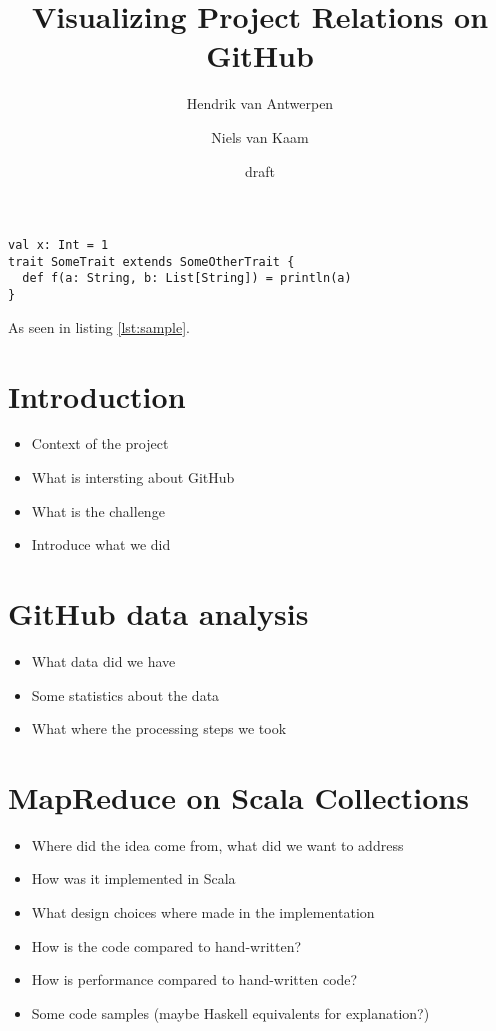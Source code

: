\documentclass[10pt,a4paper]{article}
\title{Visualizing Project Relations on GitHub}
\author{Hendrik van Antwerpen \and Niels van Kaam}
\date{draft}
\begin{document}
\maketitle

\begin{lstlisting}[label=lst:sample,caption=Sample code]
val x: Int = 1
trait SomeTrait extends SomeOtherTrait {
  def f(a: String, b: List[String]) = println(a)
}
\end{lstlisting}

As seen in listing \ref{lst:sample}.

\section{Introduction}

\begin{itemize}
    \item Context of the project
    \item What is intersting about GitHub
    \item What is the challenge
    \item Introduce what we did
\end{itemize}

\section{GitHub data analysis}

\begin{itemize}
    \item What data did we have
    \item Some statistics about the data
    \item What where the processing steps we took
\end{itemize}

\section{MapReduce on Scala Collections}

\begin{itemize}
    \item Where did the idea come from, what did we want to address
    \item How was it implemented in Scala
    \item What design choices where made in the implementation
    \item How is the code compared to hand-written?
    \item How is performance compared to hand-written code?
    \item Some code samples (maybe Haskell equivalents for explanation?)
\end{itemize}
\end{document}
